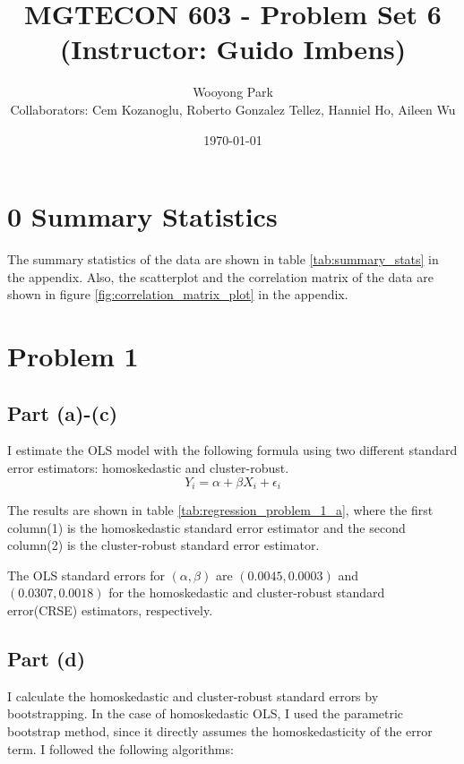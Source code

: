 \documentclass[12pt]{article}
\title{MGTECON 603 - Problem Set 6\\ \small{(Instructor: Guido Imbens)}}
\author{Wooyong Park\\ {\small Collaborators: Cem Kozanoglu, Roberto Gonzalez Tellez, Hanniel Ho, Aileen Wu}}
\date{\today}
\begin{document}
\maketitle

\section*{0 Summary Statistics}

The summary statistics of the data are shown in table \ref{tab:summary_stats} in the appendix.
Also, the scatterplot and the correlation matrix of the data are shown in figure \ref{fig:correlation_matrix_plot} in the appendix.

\section{Problem 1}
\subsection{Part (a)-(c)}

I estimate the OLS model with the following formula using two different standard error estimators: homoskedastic and cluster-robust.
\begin{equation}
    Y_i = \alpha + \beta X_i + \epsilon_i
\end{equation}

The results are shown in table \ref{tab:regression_problem_1_a}, where the first column(1) is the homoskedastic standard error estimator and the second column(2) is the cluster-robust standard error estimator.



The OLS standard errors for $(\alpha, \beta)$ are $(0.0045, 0.0003)$ and $(0.0307, 0.0018)$ for the homoskedastic and cluster-robust standard error(CRSE) estimators, respectively.

\newpage

\subsection{Part (d)}
I calculate the homoskedastic and cluster-robust standard errors by bootstrapping.
In the case of homoskedastic OLS, I used the parametric bootstrap method, since it directly assumes the homoskedasticity of the error term.
I followed the following algorithms:
\end{document}
